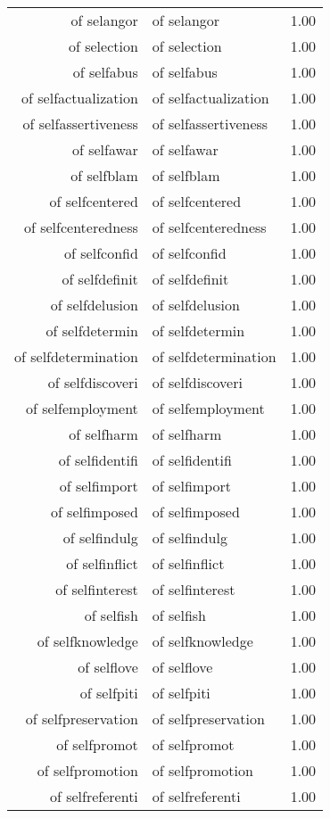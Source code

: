 \begin{table}[ht]
\begin{tabular}{rlr}
  of selangor & of selangor & 1.00 \\ 
  of selection & of selection & 1.00 \\ 
  of selfabus & of selfabus & 1.00 \\ 
  of selfactualization & of selfactualization & 1.00 \\ 
  of selfassertiveness & of selfassertiveness & 1.00 \\ 
  of selfawar & of selfawar & 1.00 \\ 
  of selfblam & of selfblam & 1.00 \\ 
  of selfcentered & of selfcentered & 1.00 \\ 
  of selfcenteredness & of selfcenteredness & 1.00 \\ 
  of selfconfid & of selfconfid & 1.00 \\ 
  of selfdefinit & of selfdefinit & 1.00 \\ 
  of selfdelusion & of selfdelusion & 1.00 \\ 
  of selfdetermin & of selfdetermin & 1.00 \\ 
  of selfdetermination & of selfdetermination & 1.00 \\ 
  of selfdiscoveri & of selfdiscoveri & 1.00 \\ 
  of selfemployment & of selfemployment & 1.00 \\ 
  of selfharm & of selfharm & 1.00 \\ 
  of selfidentifi & of selfidentifi & 1.00 \\ 
  of selfimport & of selfimport & 1.00 \\ 
  of selfimposed & of selfimposed & 1.00 \\ 
  of selfindulg & of selfindulg & 1.00 \\ 
  of selfinflict & of selfinflict & 1.00 \\ 
  of selfinterest & of selfinterest & 1.00 \\ 
  of selfish & of selfish & 1.00 \\ 
  of selfknowledge & of selfknowledge & 1.00 \\ 
  of selflove & of selflove & 1.00 \\ 
  of selfpiti & of selfpiti & 1.00 \\ 
  of selfpreservation & of selfpreservation & 1.00 \\ 
  of selfpromot & of selfpromot & 1.00 \\ 
  of selfpromotion & of selfpromotion & 1.00 \\ 
  of selfreferenti & of selfreferenti & 1.00 \\ 

\end{tabular}
\end{table}
